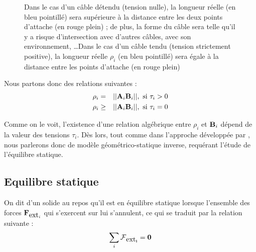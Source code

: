 \begin{figure}[!ht]
  \centering
\hfill
{}
    \caption{\footnotesize{Dans le cas d'un câble détendu (tension nulle), la 
longueur r\'eelle (en bleu pointill\'e) sera supérieure à la distance entre les 
deux points d'attache (en rouge plein) ; de plus, la forme du câble sera telle 
qu'il y a risque d'intersection avec d'autres câbles, avec son environnement, 
\dots Dans le cas d'un câble tendu (tension strictement positive), la 
longueur r\'eelle $\rho_i$ (en bleu pointill\'e) sera \'egale à la 
distance entre les points d'attache (en rouge plein)}}
\label{intro:fig6}
\end{figure}

Nous partons donc des relations suivantes :
\begin{eqnarray}
\rho_i &=& ||{\bf A}_i {\bf B}_i||, \hbox{ si } \tau_i > 0 \\ 
\rho_i &\geq& ||{\bf A}_i {\bf B}_i||, \hbox{ si } \tau_i = 0
\label{intro:eq1}
\end{eqnarray}

Comme on le voit, l'existence d'une relation alg\'ebrique entre $\rho_i$ et 
${\bf B}_i$ d\'epend de la valeur des tensions $\tau_i$. Dès lors, tout comme 
dans l'approche développée par \cite{2010:Carricato.Merlet}, nous parlerons donc 
de modèle géométrico-statique inverse, requérant l'étude de l'équilibre 
statique.

\subsection{Equilibre statique} \label{chap0-2-2}

On dit d'un solide au repos qu'il est en équilibre statique lorsque l'ensemble 
des forces $\mathcal {\bf F}_{\hbox{ext}_i}$ qui s'exercent sur lui 
s'annulent, ce qui se traduit par la relation suivante :
\begin{equation}
\sum_i \bf{\hbox{$\mathcal F$}}_{\hbox{ext}_i} = {\bf 0}
\label{intro:eq2}
\end{equation}

